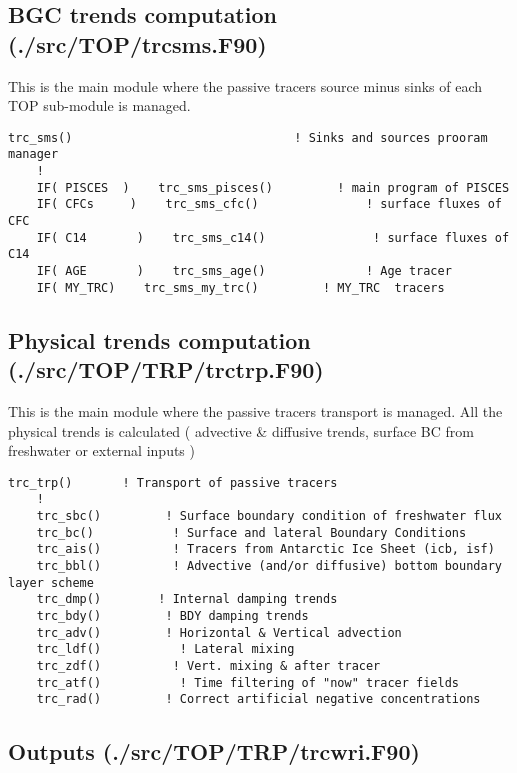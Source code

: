 \documentclass[../main/TOP_manual]{subfiles}
\begin{document}
\subsection{BGC trends computation (./src/TOP/trcsms.F90)}

This is the main module where the passive tracers source minus sinks of each TOP sub-module is managed.    

\begin{verbatim}
trc_sms()                               ! Sinks and sources prooram manager
    ! 
    IF( PISCES  )    trc_sms_pisces()         ! main program of PISCES 
    IF( CFCs     )    trc_sms_cfc()               ! surface fluxes of CFC
    IF( C14       )    trc_sms_c14()               ! surface fluxes of C14
    IF( AGE       )    trc_sms_age()              ! Age tracer
    IF( MY_TRC)    trc_sms_my_trc()         ! MY_TRC  tracers
\end{verbatim}

\subsection{Physical trends computation (./src/TOP/TRP/trctrp.F90)}

This is the main module where the passive tracers transport is managed. All the physical trends is calculated ( advective \& diffusive trends, surface BC from freshwater or external inputs ) 

\begin{verbatim}
trc_trp()       ! Transport of passive tracers
    !
    trc_sbc()         ! Surface boundary condition of freshwater flux
    trc_bc()           ! Surface and lateral Boundary Conditions 
    trc_ais()          ! Tracers from Antarctic Ice Sheet (icb, isf)               
    trc_bbl()          ! Advective (and/or diffusive) bottom boundary layer scheme
    trc_dmp()        ! Internal damping trends
    trc_bdy()         ! BDY damping trends
    trc_adv()         ! Horizontal & Vertical advection 
    trc_ldf()           ! Lateral mixing
    trc_zdf()          ! Vert. mixing & after tracer
    trc_atf()           ! Time filtering of "now" tracer fields    
    trc_rad()         ! Correct artificial negative concentrations
\end{verbatim}

\subsection{Outputs  (./src/TOP/TRP/trcwri.F90)}
\end{document}
